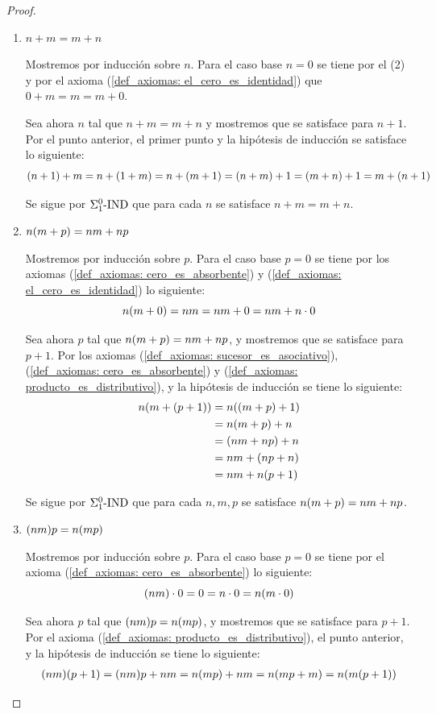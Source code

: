 \begin{proof}
\begin{enumerate}
		Se sigue por $\INDUCCION{\Sigma_{1}^{0}}$ que para cada $n$ se satisface $n + 1 = 1 + n$.

		\item $n + m = m + n$
		
		Mostremos por inducción sobre $n$. Para el caso base $n = 0$ se tiene por el (2) y por el axioma (\ref{def_axiomas: el_cero_es_identidad}) que $0 + m = m = m + 0$.

		Sea ahora $n$ tal que $n + m = m + n$ y mostremos que se satisface para $n + 1$. Por el punto anterior, el primer punto y la hipótesis de inducción se satisface lo siguiente:
		\[
			\pa*{n + 1} + m = n +\pa*{1 + m} = n +\pa*{m + 1} =\pa*{n + m} + 1 =\pa*{m + n} + 1 = m +\pa*{n + 1}
		\]

		Se sigue por $\INDUCCION{\Sigma_{1}^{0}}$ que para cada $n$ se satisface $n + m = m + n$.

		\item $n\pa*{m + p} = nm + np$
		
		Mostremos por inducción sobre $p$. Para el caso base $p = 0$ se tiene por los axiomas (\ref{def_axiomas: cero_es_absorbente}) y (\ref{def_axiomas: el_cero_es_identidad}) lo siguiente:
		\[
			n\pa*{m + 0} = nm = nm + 0 = nm + n\cdot 0
		\]

		Sea ahora $p$ tal que $n\pa*{m + p} = nm + np$, y mostremos que se satisface para $p + 1$. Por los axiomas (\ref{def_axiomas: sucesor_es_asociativo}), (\ref{def_axiomas: cero_es_absorbente}) y (\ref{def_axiomas: producto_es_distributivo}), y la hipótesis de inducción se tiene lo siguiente:
		\begin{align*}
			n\pa*{m +\pa*{p + 1}} &= n\pa*{\pa*{m + p} + 1} \\
			&= n\pa*{m + p} + n \\
			&=\pa*{nm + np} + n \\
			&= nm +\pa*{np + n} \\
			&= nm + n\pa*{p + 1}
		\end{align*}

		Se sigue por $\INDUCCION{\Sigma_{1}^{0}}$ que para cada $n, m, p$ se satisface $n\pa*{m + p} = nm + np$.

		\item $\pa*{nm}p = n\pa*{mp}$
		
		Mostremos por inducción sobre $p$. Para el caso base $p = 0$ se tiene por el axioma (\ref{def_axiomas: cero_es_absorbente}) lo siguiente:
		\[
			\pa*{nm}\cdot 0 = 0 = n\cdot 0 = n\pa*{m\cdot 0}
		\]

		Sea ahora $p$ tal que $\pa*{nm}p = n\pa*{mp}$, y mostremos que se satisface para $p + 1$. Por el axioma (\ref{def_axiomas: producto_es_distributivo}), el punto anterior, y la hipótesis de inducción se tiene lo siguiente:
		\begin{align*}
			\pa*{nm}\pa*{p + 1} = \pa*{nm}p + nm = n\pa*{mp} + nm = n\pa*{mp + m} = n\pa*{m\pa*{p + 1}}
		\end{align*}


\end{enumerate}
\end{proof}
